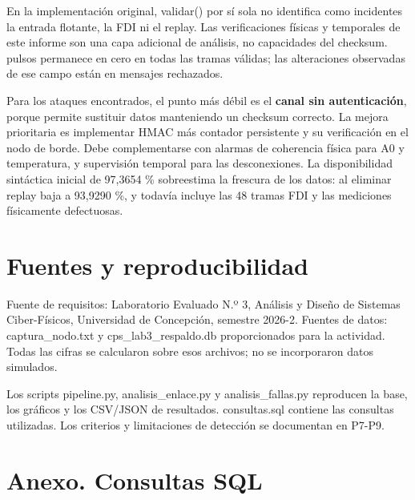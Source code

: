 \documentclass[
  11pt,
]{article}
\begin{document}
En la implementación original, validar() por sí sola no identifica como
incidentes la entrada flotante, la FDI ni el replay. Las verificaciones
físicas y temporales de este informe son una capa adicional de análisis,
no capacidades del checksum. pulsos permanece en cero en todas las
tramas válidas; las alteraciones observadas de ese campo están en
mensajes rechazados.

Para los ataques encontrados, el punto más débil es el \textbf{canal sin
autenticación}, porque permite sustituir datos manteniendo un checksum
correcto. La mejora prioritaria es implementar HMAC más contador
persistente y su verificación en el nodo de borde. Debe complementarse
con alarmas de coherencia física para A0 y temperatura, y supervisión
temporal para las desconexiones. La disponibilidad sintáctica inicial de
97,3654 \% sobreestima la frescura de los datos: al eliminar replay baja
a 93,9290 \%, y todavía incluye las 48 tramas FDI y las mediciones
físicamente defectuosas.

\hypertarget{fuentes-y-reproducibilidad}{%
\section{Fuentes y reproducibilidad}\label{fuentes-y-reproducibilidad}}

Fuente de requisitos: Laboratorio Evaluado N.º 3, Análisis y Diseño de
Sistemas Ciber-Físicos, Universidad de Concepción, semestre 2026-2.
Fuentes de datos: captura\_nodo.txt y cps\_lab3\_respaldo.db
proporcionados para la actividad. Todas las cifras se calcularon sobre
esos archivos; no se incorporaron datos simulados.

Los scripts pipeline.py, analisis\_enlace.py y analisis\_fallas.py
reproducen la base, los gráficos y los CSV/JSON de resultados.
consultas.sql contiene las consultas utilizadas. Los criterios y
limitaciones de detección se documentan en P7-P9.

\hypertarget{anexo.-consultas-sql}{%
\section{Anexo. Consultas SQL}\label{anexo.-consultas-sql}}
\end{document}
